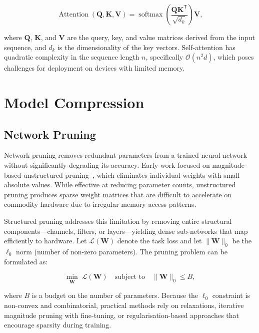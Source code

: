 \documentclass[12pt,a4paper,oneside]{book}
\begin{document}
\begin{equation}
\operatorname{Attention}(\mathbf{Q},\mathbf{K},\mathbf{V}) =
\operatorname{softmax}\!\left(\frac{\mathbf{Q}\mathbf{K}^{\mathsf{T}}}
{\sqrt{d_k}}\right)\mathbf{V},
\label{eq:attention}
\end{equation}

where $\mathbf{Q}$, $\mathbf{K}$, and $\mathbf{V}$ are the query, key,
and value matrices derived from the input sequence, and $d_k$ is the
dimensionality of the key vectors. Self-attention has quadratic
complexity in the sequence length $n$, specifically $\mathcal{O}(n^2
d)$, which poses challenges for deployment on devices with limited
memory.

\section{Model Compression}

\subsection{Network Pruning}

Network pruning removes redundant parameters from a trained neural
network without significantly degrading its accuracy. Early work
focused on magnitude-based unstructured pruning~\cite{goodfellow2016},
which eliminates individual weights with small absolute values.
While effective at reducing parameter counts, unstructured pruning
produces sparse weight matrices that are difficult to accelerate on
commodity hardware due to irregular memory access patterns.

Structured pruning addresses this limitation by removing entire
structural components---channels, filters, or layers---yielding dense
sub-networks that map efficiently to hardware. Let
$\mathcal{L}(\mathbf{W})$ denote the task loss and let
$\|\mathbf{W}\|_0$ be the $\ell_0$ norm (number of non-zero
parameters). The pruning problem can be formulated as:

\begin{equation}
\min_{\mathbf{W}} \; \mathcal{L}(\mathbf{W})
\quad\text{subject to}\quad
\|\mathbf{W}\|_0 \leq B,
\label{eq:pruning}
\end{equation}

where $B$ is a budget on the number of parameters. Because the $\ell_0$
constraint is non-convex and combinatorial, practical methods rely on
relaxations, iterative magnitude pruning with fine-tuning, or
regularisation-based approaches that encourage sparsity during training.
\end{document}
